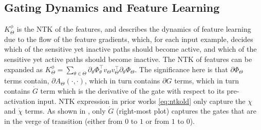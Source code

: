 \subsection{Gating Dynamics and Feature Learning} 
$K^{\phi}_{\Theta}$ is the NTK of the features, and describes the dynamics of feature learning due to the flow of the feature gradients, which, for each input example, decides which of the sensitive yet inactive paths should become active, and which of the sensitive yet active paths should become inactive. The NTK of features can be expanded as $K^{\phi}_{\Theta}=\sum_{\theta \in \Theta}\partial_{\theta} \Phi^\top_{\theta}v_{\Theta}v^\top_{\Theta}\partial_{\theta}\Phi_{\Theta}$. The significance here is that $\partial \Phi_{\Theta}$ terms contain, $\partial A_{\Theta}(\cdot,\cdot)$, which in turn contains $\partial G$ terms, which in turn contains $\dot{G}$ term which is the derivative of the gate with respect to its pre-activation input. NTK expression in prior works \eqref{eq:ntkold} only capture the $\chi$ and $\dot{\chi}$ terms. As shown in , only $\dot{G}$ (right-most plot) captures the gates that are in the verge of transition (either from $0$ to $1$ or from $1$ to $0$).
\FloatBarrier
